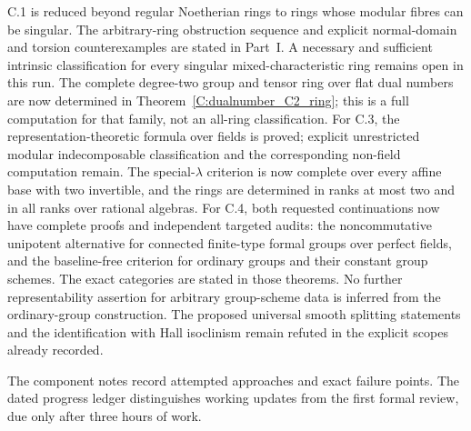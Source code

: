 C.1 is reduced beyond regular Noetherian rings to rings whose modular fibres
can be singular. The arbitrary-ring obstruction sequence and explicit
normal-domain and torsion counterexamples are stated in Part~I. A necessary
and sufficient intrinsic classification for every singular mixed-characteristic
ring remains open in this run. The complete degree-two group and tensor
ring over flat dual numbers are now determined in
Theorem~\ref{C:dualnumber_C2_ring}; this is a full computation for that
family, not an all-ring classification. For C.3, the representation-theoretic formula
over fields is proved; explicit unrestricted modular indecomposable
classification and the corresponding non-field computation remain.
The special-$\lambda$ criterion is now complete over every affine base
with two invertible, and the rings are determined in ranks at most two
and in all ranks over rational algebras.
For C.4, both requested continuations now have complete proofs and
independent targeted audits: the noncommutative unipotent alternative
for connected finite-type formal groups over perfect fields, and the
baseline-free criterion for ordinary groups and their constant group
schemes. The exact categories are stated in those theorems. No further
representability assertion for arbitrary group-scheme data is inferred
from the ordinary-group construction. The proposed universal smooth
splitting statements and the identification with Hall isoclinism remain
refuted in the explicit scopes already recorded.

The component notes record attempted approaches and exact failure points.
The dated progress ledger distinguishes working updates from the first
formal review, due only after three hours of work.
